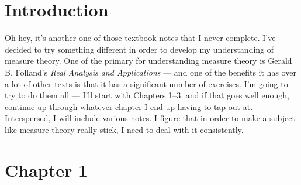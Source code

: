 \documentclass[10pt]{mypackage}
\begin{document}
\RaggedRight
\section{Introduction}%
Oh hey, it's another one of those textbook notes that I never complete. I've decided to try something different in order to develop my understanding of measure theory. One of the primary for understanding measure theory is Gerald B. Folland's \textit{Real Analysis and Applications} --- and one of the benefits it has over a lot of other texts is that it has a significant number of exercises. I'm going to try to do them all --- I'll start with Chapters 1--3, and if that goes well enough, continue up through whatever chapter I end up having to tap out at. Interspersed, I will include various notes. I figure that in order to make a subject like measure theory really stick, I need to deal with it consistently.
\tableofcontents
\section{Chapter 1}%
\end{document}
